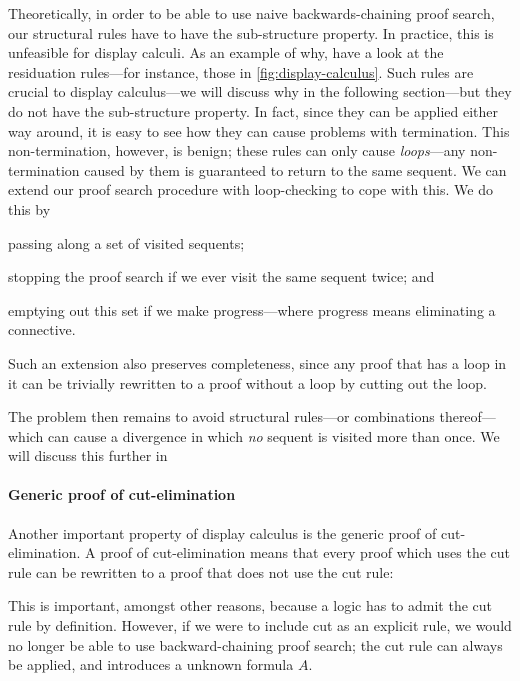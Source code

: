 Theoretically, in order to be able to use naive backwards-chaining
proof search, our structural rules have to have the sub-structure
property. In practice, this is unfeasible for display calculi.
As an example of why, have a look at the residuation rules---for
instance, those in \autoref{fig:display-calculus}. Such rules are
crucial to display calculus---we will discuss why in the following
section---but they do not have the sub-structure property. In fact,
since they can be applied either way around, it is easy to see how
they can cause problems with termination.
This non-termination, however, is benign; these rules can only cause
\emph{loops}---any non-termination caused by them is guaranteed to
return to the same sequent.
We can extend our proof search procedure with loop-checking to cope
with this. We do this by
\begin{enumerate*}[label=(\arabic*)]
\item passing along a set of visited sequents;
\item stopping the proof search if we ever visit the same sequent
  twice; and
\item emptying out this set if we make progress---where progress means
  eliminating a connective.
\end{enumerate*}
Such an extension also preserves completeness, since any proof that
has a loop in it can be trivially rewritten to a proof without a loop by
cutting out the loop.

The problem then remains to avoid structural rules---or combinations
thereof---which can cause a divergence in which \emph{no} sequent is
visited more than once. We will discuss this further in

\paragraph{Generic proof of cut-elimination}
Another important property of display calculus is the generic proof of
cut-elimination.
A proof of cut-elimination means that every proof which uses the cut
rule can be rewritten to a proof that does not use the cut rule:
\begin{prooftree}
\end{prooftree}
This is important, amongst other reasons, because a logic has to admit
the cut rule by definition. However, if we were to include cut as an
explicit rule, we would no longer be able to use backward-chaining
proof search; the cut rule can always be applied, and introduces a
unknown formula $A$.

